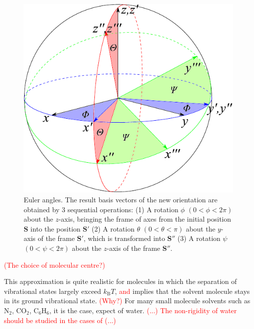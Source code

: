 \begin{enumerate}
\begin{figure}[h]
\begin{centering}
\includegraphics[scale=0.7]{_figure/euler_sphere}
\par\end{centering}

\caption[Euler angles]{Euler angles. The result basis vectors of the new orientation are
obtained by 3 sequential operations: (1) A rotation $\phi$ $(0<\phi<2\pi)$
about the $z$-axis, bringing the frame of axes from the initial position
$\mathbf{S}$ into the position $\mathbf{S}'$ (2) A rotation $\theta$
$(0<\theta<\pi)$ about the $y$-axis of the frame $\mathbf{S}'$,
which is transformed into $\mathbf{S}''$ (3) A rotation $\psi$ $(0<\psi<2\pi)$
about the $z$-axis of the frame $\mathbf{S}''$.\label{fig:Euler-angles}}
\end{figure}



\textcolor{red}{(The choice of molecular centre?)}


This approximation is quite realistic for molecules in which the separation
of vibrational states largely exceed $k_{\mathrm{B}}T$, \textcolor{red}{and}
implies that the solvent molecule stays in its ground vibrational
state. \textcolor{red}{(Why?)} For many small molecule solvents such
as $\mathrm{N_{2}}$, $\mathrm{CO_{2}}$, $\mathrm{C_{6}H_{6}}$,
it is the case, expect of water. \textcolor{red}{(...) The non-rigidity
of water should be studied in the cases of (...)}


\end{enumerate}
